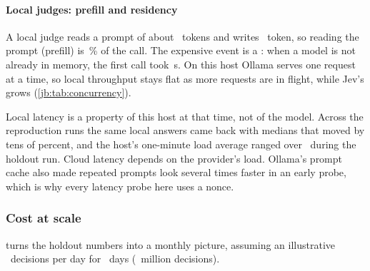 \paragraph{Local judges: prefill and residency} A local judge reads a prompt of about
\LatPromptTokens\ tokens and writes \LatDecodeTokens\ token, so reading the prompt (prefill) is
\LatPrefillShareRange\,\% of the call. The expensive event is a : when a model is not
already in memory, the first call took \LatColdRange\,s. On this host Ollama serves one request at a
time, so local throughput stays flat as more requests are in flight, while Jev's grows
(\cref{jb:tab:concurrency}).

\begin{table}[tbp]
\centering\small
\caption{Latency and throughput as requests in flight rise. $^{*}$ GPT-6 Luna at 8 in flight had
\LatLunaConcErrors\ read timeout; its throughput counts successful requests only.}
\label{jb:tab:concurrency}

\end{table}

\begin{caution}
Local latency is a property of this host at that time, not of the model. Across the reproduction runs
the same local answers came back with medians that moved by tens of percent, and the host's one-minute
load average ranged over \HoldLoadRange\ during the holdout run. Cloud latency depends on the provider's
load. Ollama's prompt cache also made repeated prompts look several times faster in an early probe,
which is why every latency probe here uses a nonce.
\end{caution}

\subsubsection{Cost at scale}

 turns the holdout numbers into a monthly picture, assuming an illustrative
\ProjPerDay\ decisions per day for \ProjDays\ days (\ProjPerMonthM\ million decisions).

\begin{table}[tbp]
\centering\small
\caption{Projected monthly API cost and wrong automatic actions at \ProjPerDay\ decisions per day,
using holdout rates \prereg. Local judges show \$0 API cost and exclude hardware, power and operations.}
\label{jb:tab:cost}

\end{table}

